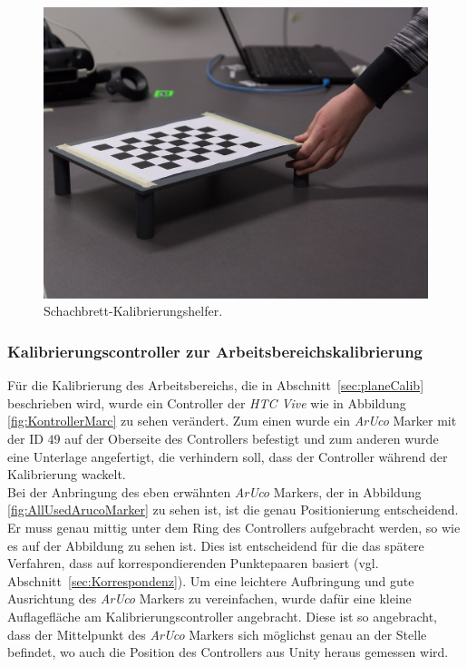 	\begin{figure}[H] 
	\center 
	\includegraphics[trim = 0mm 20mm 30mm 40mm, clip]{Bilder/Eigene Fotos/IMG_0004.jpg}			
	\caption{Schachbrett-Kalibrierungshelfer.}
	\label{fig:schachbrettKalib}
\end{figure}

\subsubsection{Kalibrierungscontroller zur Arbeitsbereichskalibrierung} \label{sec:calibController} 
Für die Kalibrierung des Arbeitsbereichs, die in Abschnitt~\ref{sec:planeCalib} beschrieben wird, wurde ein Controller der \textit{HTC Vive} wie in Abbildung \ref{fig:KontrollerMarc} zu sehen verändert. Zum einen wurde ein \textit{ArUco} Marker mit der ID $49$ auf der Oberseite des Controllers befestigt und zum anderen wurde eine Unterlage angefertigt, die verhindern soll, dass der Controller während der Kalibrierung wackelt.\\
Bei der Anbringung des eben erwähnten \textit{ArUco} Markers, der in Abbildung \ref{fig:AllUsedArucoMarker} zu sehen ist, ist die genau Positionierung entscheidend. Er muss genau mittig unter dem Ring des Controllers aufgebracht werden, so wie es auf der Abbildung zu sehen ist. Dies ist entscheidend für die das spätere Verfahren, dass auf korrespondierenden Punktepaaren basiert (vgl. Abschnitt~\ref{sec:Korrespondenz}). Um eine leichtere Aufbringung und gute Ausrichtung des \textit{ArUco} Markers zu vereinfachen, wurde dafür eine kleine Auflagefläche am  Kalibrierungscontroller angebracht. Diese ist so angebracht, dass der Mittelpunkt des \textit{ArUco} Markers sich möglichst genau an der Stelle befindet, wo auch die Position des Controllers aus Unity heraus gemessen wird.

